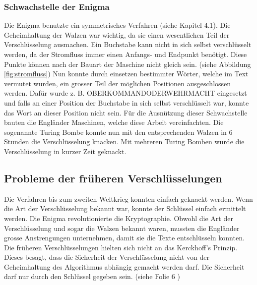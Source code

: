 \subsubsection{Schwachstelle der Enigma}
Die Enigma benutzte ein symmetrisches Verfahren (siehe Kapitel 4.1). %
Die Geheimhaltung der Walzen war wichtig, da sie einen wesentlichen Teil der Verschlüsselung ausmachen.
Ein Buchstabe kann nicht in sich selbst verschlüsselt werden, da der Stromfluss immer einen Anfangs- und Endpunkt benötigt. Diese Punkte können nach der Bauart der Maschine nicht gleich sein. (siehe Abbildung \ref{fig:stromfluss})
Nun konnte durch einsetzen bestimmter Wörter, welche im Text vermutet wurden, ein grosser Teil der möglichen Positionen ausgeschlossen werden. Dafür wurde z. B. OBERKOMMANDODERWEHRMACHT eingesetzt und falls an einer Position der Buchstabe in sich selbst verschlüsselt war, konnte das Wort an dieser Position nicht sein. Für die Ausnützung dieser Schwachstelle bauten die Engländer Maschinen, welche diese Arbeit vereinfachten. Die sogenannte Turing Bombe konnte nun mit den entsprechenden Walzen in 6 Stunden die Verschlüsselung knacken. 
Mit mehreren Turing Bomben wurde die Verschlüsselung in kurzer Zeit geknackt. 
%
\subsection{Probleme der früheren Verschlüsselungen}
\label{sec:Probleme_der_frueheren_Verschluesselungen}
Die Verfahren bis zum zweiten Weltkrieg konnten einfach geknackt werden. Wenn die Art der Verschlüsselung bekannt war, konnte der Schlüssel einfach ermittelt werden. 
Die Enigma revolutionierte die Kryptographie. Obwohl die Art der Verschlüsselung und sogar die Walzen bekannt waren, mussten die Engländer grosse Anstrengungen unternehmen, damit sie die Texte entschlüsseln konnten. \\[2ex]
%
Die früheren Verschlüsselungen hielten sich nicht an das Kerckhoff's Prinzip. Dieses besagt, dass die Sicherheit der Verschlüsselung nicht von der Geheimhaltung des Algorithmus abhängig gemacht werden darf. Die Sicherheit darf nur durch den Schlüssel gegeben sein. (siehe Folie 6 \cite{kerckhoffsprinzip} )
%
